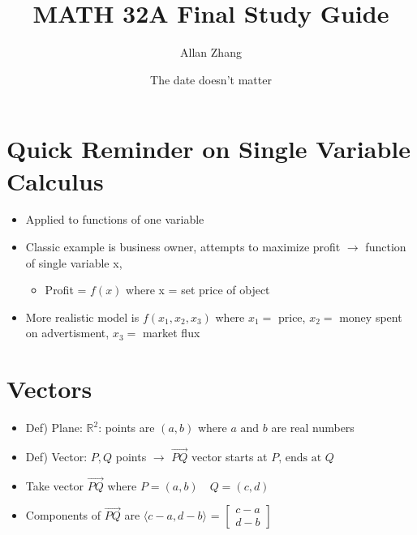 \documentclass[hidelinks]{article}
\title{\textbf{MATH 32A Final Study Guide}}
\author{Allan Zhang}
\date{The date doesn't matter}
\begin{document}
\hypersetup{bookmarksnumbered=true,}
\pagecolor{white}
\color{black}
\maketitle

\section{Quick Reminder on Single Variable Calculus}
\begin{itemize}
	\item Applied to functions of one variable
	\item Classic example is business owner, attempts to maximize profit $\rightarrow$ function of single variable x, 
	\begin{itemize}
		\item Profit = $f(x)$ where x = set price of object 
	\end{itemize}
	\item More realistic model is $f(x_1, x_2, x_3)$ where $x_1 = $ price, $x_2 = $ money spent on advertisment, $x_3 =$ market flux 
\end{itemize}

\section{Vectors}
\begin{itemize}
	\item Def) Plane: $\mathbb{R}^2$: points are $(a, b)$ where $a \text{ and } b $ are real numbers
	\item Def) Vector: $P, Q$ points $\rightarrow$ $\vec{PQ}$ vector starts at $P \text{, ends at } Q$ 
\end{itemize}
\begin{itemize}
	\item Take vector $\vec{PQ}$ where $P = (a, b) \quad Q = (c, d)$ 
	\item[] \quad Components of $\vec{PQ}$ are $\langle c - a, d -b \rangle$ = $\begin{bmatrix} c-a \\ d- b \end{bmatrix}$
\end{itemize}
\end{document}

